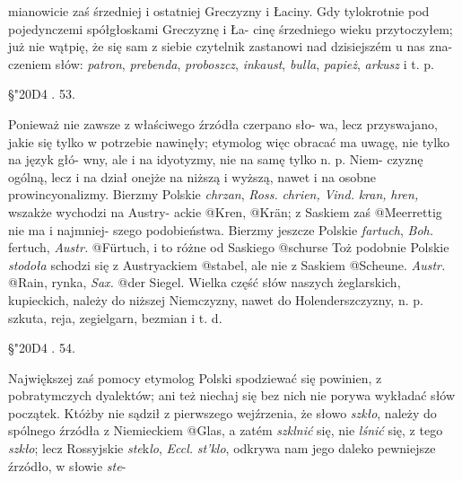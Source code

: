 

mianowicie zaś śrzedniej i ostatniej Greczyzny i Łaciny. Gdy
tylokrotnie pod pojedynczemi spółgłoskami Greczyznę i Ła-
cinę śrzedniego wieku przytoczyłem; już nie wątpię, że się
sam z siebie czytelnik zastanowi nad dzisiejszém u nas zna-
czeniem słów: \textit{patron}, \textit{prebenda}, \textit{proboszcz}, \textit{inkaust}, \textit{bulla},
\textit{papież}, \textit{arkusz} i t. p. 


\begin{center}
§\char"20D4 . 53. \\
\end{center} 


Ponieważ nie zawsze z właściwego źrzódła czerpano sło-
wa, lecz przyswajano, jakie się tylko w potrzebie nawinęły;
etymolog więc obracać ma uwagę, nie tylko na język głó-
wny, ale i na idyotyzmy, nie na samę tylko n. p. Niem-
czyznę ogólną, lecz i na dział onejże na niższą i wyższą,
nawet i na osobne prowincyonalizmy. Bierzmy Polskie \textit{chrzan},
\textit{Ross.} \textit{chrien,} \textit{Vind.} \textit{kran,} \textit{hren,} wszakże wychodzi na Austry-
ackie @{Kren}, @{Krän}; z Saskiem zaś @{Meerrettig} nie ma i najmniej-
szego podobieństwa. Bierzmy jeszcze Polskie \textit{fartuch}, \textit{Boh.}
fertuch, \textit{Austr.} @{Fürtuch}, i to różne od Saskiego @{schurse} Toż
podobnie Polskie \textit{stodoła} schodzi się z Austryackiem @{stabel},
ale nie z Saskiem @{Scheune}. \textit{Austr.} @{Rain}, rynka, \textit{Sax.} @{der Siegel.}
Wielka część słów naszych żeglarskich, kupieckich, należy
do niższej Niemczyzny, nawet do Holenderszczyzny, n. p.
szkuta, reja, zegielgarn, bezmian i t. d. 


\begin{center}
§\char"20D4 . 54. \\
\end{center} 

Największej zaś pomocy etymolog Polski spodziewać się
powinien, z pobratymczych dyalektów; ani też niechaj się
bez nich nie porywa wykładać słów początek. Któżby nie
sądził z pierwszego wejźrzenia, że słowo \textit{szkło}, należy do
spólnego źrzódła z Niemieckiem @{Glas}, a zatém \textit{szklnić} się,
nie \textit{lśnić} się, z tego \textit{szkło}; lecz Rossyjskie \textit{ste}k\textit{lo}, \textit{Eccl.} \textit{st'klo},
odkrywa nam jego daleko pewniejsze źrzódło, w słowie \textit{ste}-

